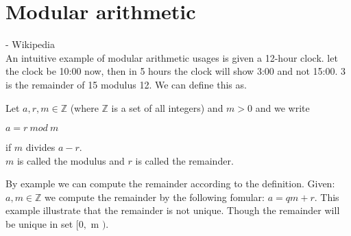 \section{Modular arithmetic} \label{sec:modular_arithmetic} 
 - Wikipedia \\

\noindent
An intuitive example of modular arithmetic usages is given a 12-hour clock. let the clock be 10:00 now, then in 5 hours the clock will show 3:00 and not 15:00. 3 is the remainder of 15 modulus 12. We can define this as.  \\

\begin{defi}
Let \begin{math} a, r,m \in  \mathbb{Z}\end{math} (where \begin{math} \mathbb{Z}\end{math} is a set of all integers) and \begin{math} m > 0\end{math} and we write  
\begin{center} \begin{math} a = r \ mod \ m\end{math} \end{center}
if \begin{math}m \end{math} divides \begin{math} a - r \end{math}.\\
\begin{math}m \end{math} is called the modulus and \begin{math}r \end{math} is called the remainder.
\end{defi}

 By example we can compute the remainder according to the definition. Given: \begin{math} a, m \in \mathbb{Z} \end{math} we compute the remainder by the following fomular:  \begin{math} a = qm +r \end{math}. This example illustrate that the remainder is not unique. Though the remainder will be unique in set $[0,$ m $)$.

